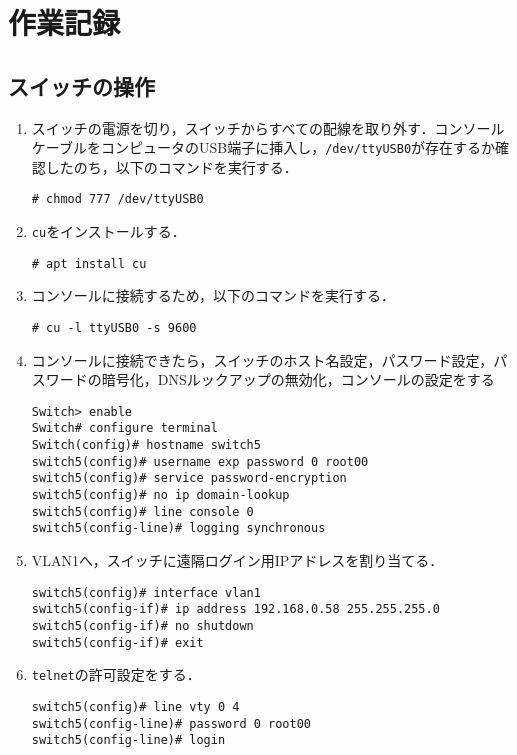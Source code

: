 \section{作業記録}
\subsection{スイッチの操作}
\begin{enumerate}
    \renewcommand{\labelenumi}{\textbf{\theenumi.}\ }
    \item スイッチの電源を切り，スイッチからすべての配線を取り外す．コンソールケーブルをコンピュータのUSB端子に挿入し，\texttt{/dev/ttyUSB0}が存在するか確認したのち，以下のコマンドを実行する．
          \begin{lstlisting}
# chmod 777 /dev/ttyUSB0 
    \end{lstlisting}
    \item \texttt{cu}をインストールする．
          \begin{lstlisting}
# apt install cu            
        \end{lstlisting}
    \item コンソールに接続するため，以下のコマンドを実行する．
          \begin{lstlisting}
# cu -l ttyUSB0 -s 9600                
            \end{lstlisting}
    \item コンソールに接続できたら，スイッチのホスト名設定，パスワード設定，パスワードの暗号化，DNSルックアップの無効化，コンソールの設定をする
          \begin{lstlisting}
Switch> enable
Switch# configure terminal
Switch(config)# hostname switch5
switch5(config)# username exp password 0 root00
switch5(config)# service password-encryption
switch5(config)# no ip domain-lookup
switch5(config)# line console 0
switch5(config-line)# logging synchronous
\end{lstlisting}
    \item VLAN1へ，スイッチに遠隔ログイン用IPアドレスを割り当てる．
          \begin{lstlisting}
switch5(config)# interface vlan1
switch5(config-if)# ip address 192.168.0.58 255.255.255.0
switch5(config-if)# no shutdown
switch5(config-if)# exit
\end{lstlisting}
    \item \texttt{telnet}の許可設定をする．
          \begin{lstlisting}
switch5(config)# line vty 0 4
switch5(config-line)# password 0 root00
switch5(config-line)# login

\end{lstlisting}
\end{enumerate}
